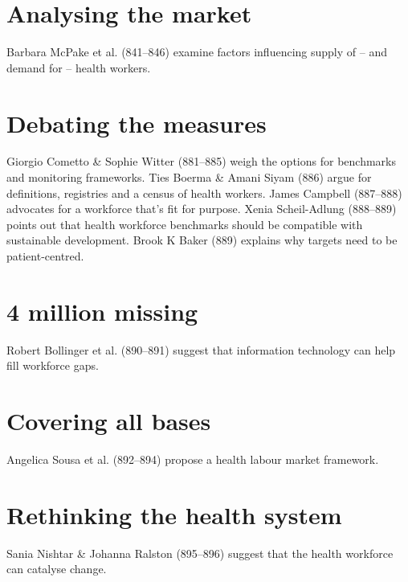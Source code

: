 \documentclass{article}
\begin{document}
\section{Analysing the market}

Barbara McPake et al. (841–846) examine factors influencing supply of – and
demand
for – health workers.

\section{Debating the measures}

Giorgio Cometto \& Sophie Witter (881–885) weigh the options for benchmarks and
monitoring frameworks. Ties Boerma \& Amani Siyam (886) argue for definitions,
registries and a
census of health workers. James Campbell (887–888) advocates for a workforce
that's
fit for purpose. Xenia Scheil-Adlung (888–889) points out that health workforce
benchmarks
should be compatible with sustainable development. Brook K Baker (889) explains
why targets
need to be patient-centred.

\section{4 million missing}

Robert Bollinger et al. (890–891) suggest that information technology can help
fill
workforce gaps.

\section{Covering all bases}

Angelica Sousa et al. (892–894) propose a health labour market framework.

\section{Rethinking the health system}

Sania Nishtar \& Johanna Ralston (895–896) suggest that the health workforce can
catalyse change.
\end{document}

